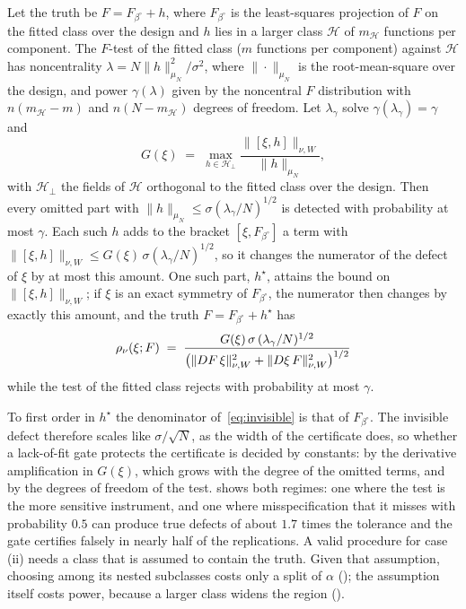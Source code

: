 \begin{proposition}
\label{prop:lof}
Let the truth be $F = F_{\beta^\circ} + h$, where $F_{\beta^\circ}$ is the
least-squares projection of $F$ on the fitted class over the design and $h$
lies in a larger class $\mathcal H$ of $m_{\mathcal H}$ functions per
component. The $F$-test of the fitted class ($m$ functions per component)
against $\mathcal H$ has noncentrality $\lambda = N\|h\|^2_{\mu_N}/\sigma^2$,
where $\|\cdot\|_{\mu_N}$ is the root-mean-square over the design, and power
$\gamma(\lambda)$ given by the noncentral $F$ distribution with $n(m_{\mathcal
H}-m)$ and $n(N-m_{\mathcal H})$ degrees of freedom. Let $\lambda_\gamma$ solve
$\gamma(\lambda_\gamma)=\gamma$ and
\begin{equation}
  G(\xi) \;=\; \max_{h \in \mathcal H_\perp}
  \frac{\|[\xi,h]\|_{\nu,W}}{\|h\|_{\mu_N}},
  \label{eq:invisible-gain}
\end{equation}
with $\mathcal H_\perp$ the fields of $\mathcal H$ orthogonal to the fitted
class over the design. Then every omitted part with
$\|h\|_{\mu_N} \le \sigma(\lambda_\gamma/N)^{1/2}$ is detected with probability
at most $\gamma$. Each such $h$ adds to the bracket $[\xi,F_{\beta^\circ}]$ a
term with $\|[\xi,h]\|_{\nu,W} \le G(\xi)\,\sigma(\lambda_\gamma/N)^{1/2}$, so it
changes the numerator of the defect of $\xi$ by at most this amount. One
such part, $h^\star$, attains the bound on $\|[\xi,h]\|_{\nu,W}$; if $\xi$ is an
exact symmetry of $F_{\beta^\circ}$, the numerator then changes by exactly this
amount, and the truth $F = F_{\beta^\circ} + h^\star$ has
\begin{equation}
  \rho_\nu(\xi;F) \;=\; \frac{G(\xi)\,\sigma\,(\lambda_\gamma/N)^{1/2}}
  {\bigl(\|DF\,\xi\|^2_{\nu,W} + \|D\xi\,F\|^2_{\nu,W}\bigr)^{1/2}}
  \label{eq:invisible}
\end{equation}
while the test of the fitted class rejects with probability at most $\gamma$.
\end{proposition}

To first order in $h^\star$ the denominator of~\eqref{eq:invisible} is that of
$F_{\beta^\circ}$. The invisible defect therefore scales like $\sigma/\sqrt N$, as the
width of the certificate does, so whether a lack-of-fit gate protects the
certificate is decided by constants: by the derivative amplification in
$G(\xi)$, which grows with the degree of the omitted terms, and by the degrees
of freedom of the test.  shows both regimes: one where the
test is the more sensitive instrument, and one where misspecification that it
misses with probability $0.5$ can produce true defects of about $1.7$ times the
tolerance and the gate certifies falsely in nearly half of the replications. A
valid procedure for case (ii) needs a class that is assumed to contain the
truth. Given that assumption, choosing among its nested subclasses costs only a
split of $\alpha$ (); the assumption itself costs power,
because a larger class widens the region ().


